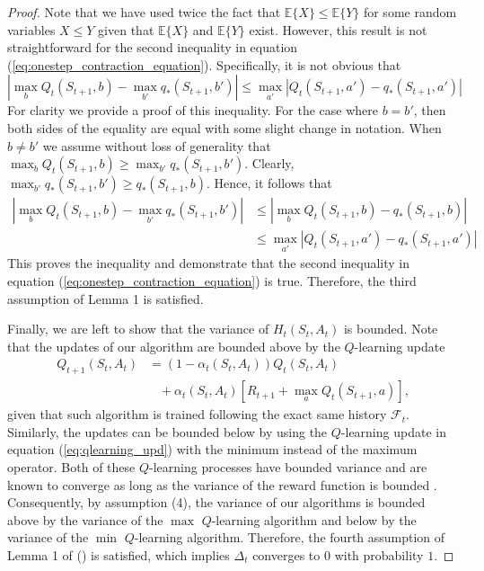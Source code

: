 \begin{proof}
Note that we have used twice the fact that $\mathbb{E} \{ X \} \leq  \mathbb{E} \{ Y \}$ for some random variables $X \leq Y$ given that $\mathbb{E} \{ X \}$ and $\mathbb{E} \{ Y \}$ exist.
However, this result is not straightforward for the second inequality in equation (\ref{eq:onestep_contraction_equation}). 
Specifically, it is not obvious that
%
\begin{equation*}
| \max_b Q_t(S_{t+1}, b) - \max_{b'} q_*(S_{t+1}, b') |
	\leq \max_{a'} | Q_t(S_{t+1}, a') - q_*(S_{t+1}, a') |
\end{equation*}
%
For clarity we provide a proof of this inequality. 
For the case where $b = b'$, then both sides of the equality are equal with some slight change in notation.
When $b \neq b'$ we assume without loss of generality that $\max_b Q_t(S_{t+1}, b) \geq \max_{b'} q_*(S_{t+1}, b')$.
Clearly, $\max_{b'} q_* (S_{t+1}, b') \geq q_* (S_{t+1}, b)$.
Hence, it follows that 
%
\begin{align*}
| \max_b Q_t (S_{t+1}, b) - \max_{b'} q_* (S_{t+1}, b') | 
	& \leq | \max_b Q_{t} (S_{t+1}, b) - q_* (S_{t+1}, b) |
    \\
    & \leq \max_{a'} | Q_t (S_{t+1}, a') - q_* (S_{t+1}, a') |
\end{align*}
This proves the inequality and demonstrate that the second inequality in equation (\ref{eq:onestep_contraction_equation}) is true. 
Therefore, the third assumption of Lemma 1 is satisfied.

Finally, we are left to show that the variance of $H_t(S_t,A_t)$ is bounded. 
Note that the updates of our algorithm are bounded above by the $Q$-learning update
\begin{align}
\label{eq:qlearning_upd}
Q_{t+1}(S_t, A_t) &= (1-\alpha_t(S_t,A_t)) Q_t(S_t, A_t) 
	\nonumber \\
& \hspace{10pt}
	+ \alpha_t(S_t, A_t) [ R_{t+1} + \max_a Q_t(S_{t+1}, a) ],
\end{align}
given that such algorithm is trained following the exact same history $\mathcal{F}_t$.
Similarly, the updates can be bounded below by using the $Q$-learning update in equation (\ref{eq:qlearning_upd}) with the minimum instead of the maximum operator. 
Both of these $Q$-learning processes have bounded variance and are known to converge as long as the variance of the reward function is bounded \parencite{Tsitsiklis1994,Jaakkola:1994:CSI:1362288.1362296,Singh2000}.
Consequently, by assumption (4), the variance of our algorithms is bounded above by the variance of the $\max$ $Q$-learning algorithm and below by the variance of the $\min$ $Q$-learning algorithm.
Therefore, the fourth assumption of Lemma 1 of \citeauthor{Singh2000} (\citeyear{Singh2000}) is satisfied, which implies $\Delta_t$ converges to $0$ with probability $1$.
\end{proof}

